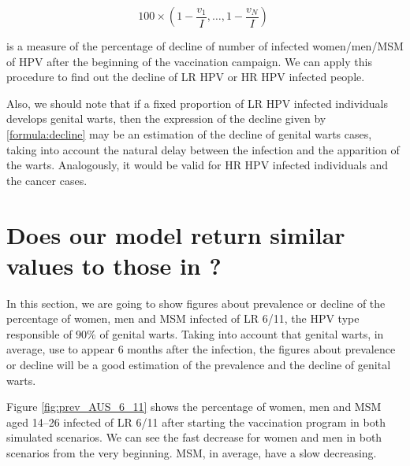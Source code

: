 \begin{equation}
100 \times \left( 1-\displaystyle\frac{v_1}{I}, \ldots, 1-\displaystyle\frac{v_N}{I} \right) \; 
\label{formula:decline}
\end{equation}

is a measure of the percentage of decline of number of infected women/men/MSM of HPV after the beginning of the vaccination campaign. We can apply this procedure to find out the decline of LR HPV or HR HPV infected people.

Also, we should note that if a fixed proportion of LR HPV infected individuals develops genital warts, then the expression of the decline given by \eqref{formula:decline} may be an estimation of the decline of genital warts cases, taking into account the natural delay between the infection and the apparition of the warts. Analogously, it would be valid for HR HPV infected individuals and the cancer cases. 

\section{Does our model return similar values to those in \cite{ali2013genital}?}
In this section, we are going to show figures about prevalence or decline of the percentage of women, men and MSM infected of LR 6/11, the HPV type responsible of $90\%$ of genital warts. Taking into account that genital warts, in average, use to appear 6 months after the infection, the figures about prevalence or decline will be a good estimation of the prevalence and the  decline of genital warts.  

Figure \ref{fig:prev_AUS_6_11} shows the percentage of women, men and MSM aged 14–26 infected of LR 6/11 after starting the vaccination program in both simulated scenarios. We can see the fast decrease for women and men in both scenarios from the very beginning. MSM, in average, have a slow decreasing. 

